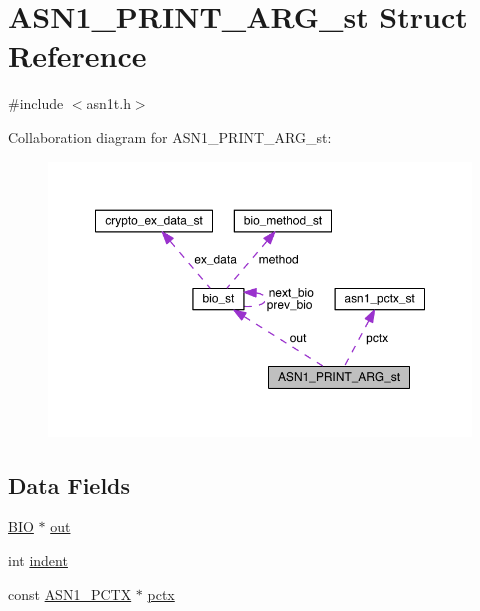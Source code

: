 \hypertarget{struct_a_s_n1___p_r_i_n_t___a_r_g__st}{}\section{A\+S\+N1\+\_\+\+P\+R\+I\+N\+T\+\_\+\+A\+R\+G\+\_\+st Struct Reference}
\label{struct_a_s_n1___p_r_i_n_t___a_r_g__st}


{\ttfamily \#include $<$asn1t.\+h$>$}



Collaboration diagram for A\+S\+N1\+\_\+\+P\+R\+I\+N\+T\+\_\+\+A\+R\+G\+\_\+st\+:\nopagebreak
\begin{figure}[H]
\begin{center}
\leavevmode
\includegraphics[width=350pt]{struct_a_s_n1___p_r_i_n_t___a_r_g__st__coll__graph}
\end{center}
\end{figure}
\subsection*{Data Fields}
\begin{DoxyCompactItemize}
\item 
\hyperlink{crypto_2bio_2bio_8h_af3fabae1c9af50b9312cdff41e11d1dd}{B\+IO} $\ast$ \hyperlink{struct_a_s_n1___p_r_i_n_t___a_r_g__st_a05bc032abf108b32fc96d54922811784}{out}
\item 
int \hyperlink{struct_a_s_n1___p_r_i_n_t___a_r_g__st_a913a30aaae68bab9c263fd5208679335}{indent}
\item 
const \hyperlink{crypto_2ossl__typ_8h_a88063a1a0d89cda63e8a53c271225bd3}{A\+S\+N1\+\_\+\+P\+C\+TX} $\ast$ \hyperlink{struct_a_s_n1___p_r_i_n_t___a_r_g__st_a537aed2182aa0dfd83321156bd167c3d}{pctx}
\end{DoxyCompactItemize}


